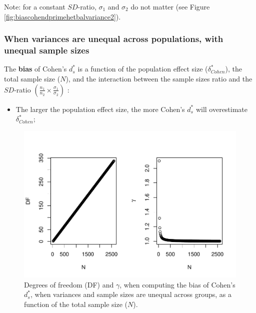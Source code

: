 \documentclass[
  english,
  man,mask]{apa6}
\providecommand{\tightlist}{%
  \setlength{\itemsep}{0pt}\setlength{\parskip}{0pt}}
\begin{document}
Note: for a constant \(SD\)-ratio, \(\sigma_1\) and \(\sigma_2\) do not matter (see Figure \ref{fig:biascohendprimehetbalvariance2}).

\hypertarget{when-variances-are-unequal-across-populations-with-unequal-sample-sizes}{%
\subsubsection{When variances are unequal across populations, with unequal sample sizes}\label{when-variances-are-unequal-across-populations-with-unequal-sample-sizes}}

The \textbf{bias} of Cohen's \(d^*_s\) is a function of the population effect size (\(\delta^*_{Cohen}\)), the total sample size (\(N\)), and the interaction between the sample sizes ratio and the \(SD\)-ratio \(\left(\frac{n_1}{n_2}\times\frac{\sigma_1}{\sigma_2} \right)\) :

\begin{itemize}
\tightlist
\item
  The larger the population effect size, the more Cohen's \(d^*_s\) will overestimate \(\delta^*_{Cohen}\);
\end{itemize}

\begin{figure}
\centering
\includegraphics{Theoretical-Bias-of-all-estimators-as-a-function-of-population-parameters_files/figure-latex/biascohendprimehetunbalNsize2-1.pdf}
\caption{\label{fig:biascohendprimehetunbalNsize2}Degrees of freedom (DF) and \(\gamma\), when computing the bias of Cohen's \(d^*_s\), when variances and sample sizes are unequal across groups, as a function of the total sample size (\(N\)).}
\end{figure}
\end{document}

